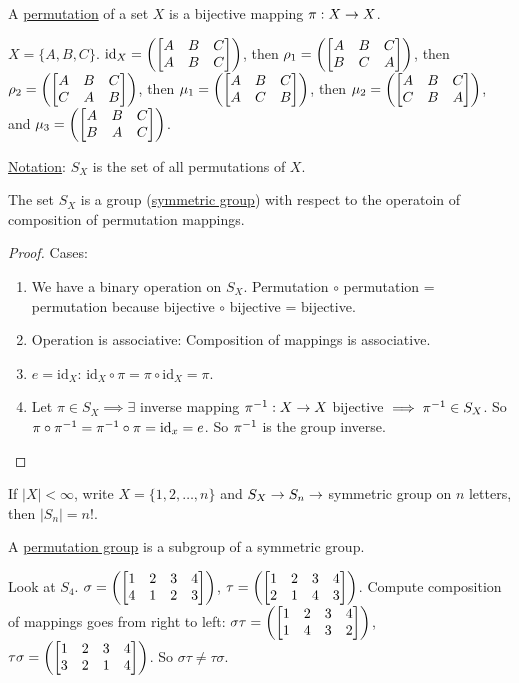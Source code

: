 \documentclass[]{article}
\begin{document}
\begin{definition}
	A \ul{permutation} of a set $X$ is a bijective mapping $\pi: X\rightarrow X$.
\end{definition}
\begin{example}
	$X = \{A,B,C\}$. $\text{id}_X = \left(\begin{bmatrix}A&B&C\\A&B&C\end{bmatrix}\right)$, then $\rho_1 = \left(\begin{bmatrix}A&B&C \\ B&C&A\end{bmatrix}\right)$, then $\rho_2 = \left(\begin{bmatrix}A&B&C\\C&A&B\end{bmatrix} \right)$, then $\mu_1 = \left(\begin{bmatrix}A&B&C\\A&C&B\end{bmatrix}\right)$, then $\mu_2 = \left( \begin{bmatrix}A&B&C\\C&B&A\end{bmatrix}\right)$, and $\mu_3 = \left(\begin{bmatrix}A&B&C\\B&A&C\end{bmatrix}\right)$.
\end{example}
\ul{Notation}: $S_X$ is the set of all permutations of $X$.

\begin{theorem}
	The set $S_X$ is a group (\ul{symmetric group}) with respect to the operatoin of composition of permutation mappings.
\end{theorem}
\begin{proof}
	Cases:
	\begin{enumerate}
		\item We have a binary operation on $S_X$. Permutation $\circ$ permutation = permutation because bijective $\circ$ bijective = bijective.
		\item Operation is associative: Composition of mappings is associative.
		\item $e = \text{id}_X$: $\text{id}_X \circ \pi = \pi\circ \text{id}_X = \pi$.
		\item Let $\pi\in S_X \implies \exists$ inverse mapping $\pi^{-1}: X\rightarrow X$ bijective $\implies \pi^{-1}\in S_X$. So $\pi\circ\pi^{-1} = \pi^{-1}\circ\pi = \text{id}_x = e$. So $\pi^{-1}$ is the group inverse.
	\end{enumerate}
\end{proof}

If $|X|<\infty$, write $X = \{1,2,\dots,n\}$ and $S_X\rightarrow S_n \rightarrow$ symmetric group on $n$ letters, then $|S_n| = n!$.

\begin{definition}
	A \ul{permutation group} is a subgroup of a symmetric group.
\end{definition}
\begin{example}
	Look at $S_4$. $\sigma = \left(\begin{bmatrix}1&2&3&4\\4&1&2&3\end{bmatrix}\right)$, $\tau = \left( \begin{bmatrix}1&2&3&4 \\ 2&1&4&3\end{bmatrix}\right)$. Compute composition of mappings goes from right to left: $\sigma \tau  = \left(\begin{bmatrix}1&2&3&4\\1&4&3&2\end{bmatrix}\right)$, $\tau\sigma = \left( \begin{bmatrix}1&2&3&4\\3&2&1&4\end{bmatrix}\right)$. So $\sigma\tau \neq \tau\sigma$.
\end{example}
\end{document}
